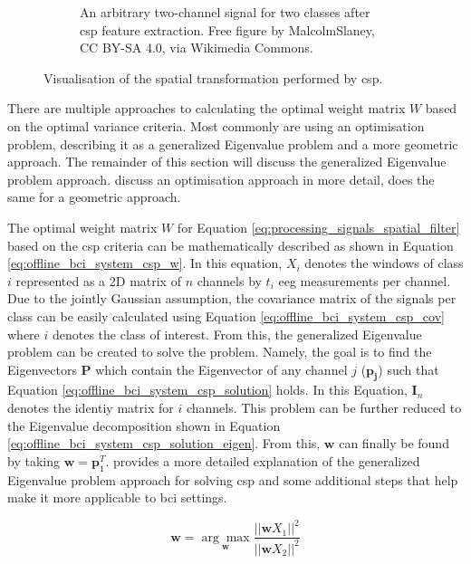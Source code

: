 \begin{figure}[t]
\begin{subfigure}{0.45\textwidth}
        \captionsetup{width=\linewidth}
        \captionsetup{justification=centering}
        \caption{An arbitrary two-channel signal for two classes after \gls{csp} feature extraction. Free figure by MalcolmSlaney, CC BY-SA 4.0, via Wikimedia Commons.}
        \label{fig:offline_bci_system_csp_post}
    \end{subfigure}
    \captionsetup{width=\linewidth}
    \captionsetup{justification=centering}
    \caption{Visualisation of the spatial transformation performed by \gls{csp}.}
    \label{fig:offline_bci_system_csp}
\end{figure}

There are multiple approaches to calculating the optimal weight matrix $W$ based on the optimal variance criteria.
Most commonly are using an optimisation problem, describing it as a generalized Eigenvalue problem and a more geometric approach.
The remainder of this section will discuss the generalized Eigenvalue problem approach.
 discuss an optimisation approach in more detail, \citet{csp_geometry} does the same for a geometric approach.

The optimal weight matrix $W$ for Equation \ref{eq:processing_signals_spatial_filter} based on the \gls{csp} criteria can be mathematically described as shown in Equation \ref{eq:offline_bci_system_csp_w}.
In this equation, $X_i$ denotes the windows of class $i$ represented as a 2D matrix of $n$ channels by $t_i$ \gls{eeg} measurements per channel.
Due to the jointly Gaussian assumption, the covariance matrix of the signals per class can be easily calculated using Equation \ref{eq:offline_bci_system_csp_cov} where $i$ denotes the class of interest.
From this, the generalized Eigenvalue problem can be created to solve the problem.
Namely, the goal is to find the Eigenvectors $\mathbf{P}$ which contain the Eigenvector of any channel $j$ ($\mathbf{p_j}$) such that Equation \ref{eq:offline_bci_system_csp_solution} holds.
In this Equation, $\mathbf{I}_n$ denotes the identiy matrix for $i$ channels.
This problem can be further reduced to the Eigenvalue decomposition shown in Equation \ref{eq:offline_bci_system_csp_solution_eigen}.
From this, $\mathbf{w}$ can finally be found by taking $\mathbf{w} = \mathbf{p}^T_1$.
 provides a more detailed explanation of the generalized Eigenvalue problem approach for solving \gls{csp} and some additional steps that help make it more applicable to \gls{bci} settings.

\begin{equation}
    \label{eq:offline_bci_system_csp_w}
    \mathbf{w} = \underset{\mathbf{w}}{\arg\max} \frac{|| \mathbf{w} X_1 ||^2}{|| \mathbf{w} X_2 ||^2}
\end{equation}

